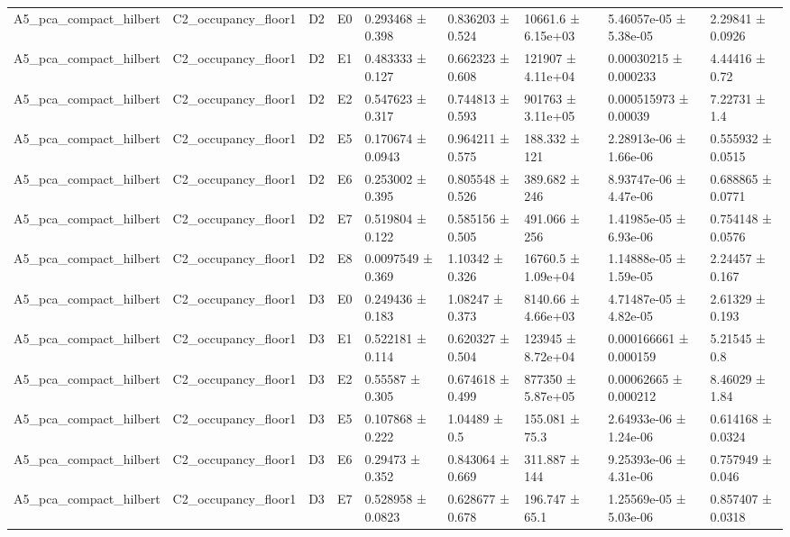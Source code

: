 \begin{table}
\begin{tabular}{lllllllll}
A5\_pca\_compact\_hilbert & C2\_occupancy\_floor1 & D2 & E0 & 0.293468 ± 0.398 & 0.836203 ± 0.524 & 10661.6 ± 6.15e+03 & 5.46057e-05 ± 5.38e-05 & 2.29841 ± 0.0926 \\
A5\_pca\_compact\_hilbert & C2\_occupancy\_floor1 & D2 & E1 & 0.483333 ± 0.127 & 0.662323 ± 0.608 & 121907 ± 4.11e+04 & 0.00030215 ± 0.000233 & 4.44416 ± 0.72 \\
A5\_pca\_compact\_hilbert & C2\_occupancy\_floor1 & D2 & E2 & 0.547623 ± 0.317 & 0.744813 ± 0.593 & 901763 ± 3.11e+05 & 0.000515973 ± 0.00039 & 7.22731 ± 1.4 \\
A5\_pca\_compact\_hilbert & C2\_occupancy\_floor1 & D2 & E5 & 0.170674 ± 0.0943 & 0.964211 ± 0.575 & 188.332 ± 121 & 2.28913e-06 ± 1.66e-06 & 0.555932 ± 0.0515 \\
A5\_pca\_compact\_hilbert & C2\_occupancy\_floor1 & D2 & E6 & 0.253002 ± 0.395 & 0.805548 ± 0.526 & 389.682 ± 246 & 8.93747e-06 ± 4.47e-06 & 0.688865 ± 0.0771 \\
A5\_pca\_compact\_hilbert & C2\_occupancy\_floor1 & D2 & E7 & 0.519804 ± 0.122 & 0.585156 ± 0.505 & 491.066 ± 256 & 1.41985e-05 ± 6.93e-06 & 0.754148 ± 0.0576 \\
A5\_pca\_compact\_hilbert & C2\_occupancy\_floor1 & D2 & E8 & 0.0097549 ± 0.369 & 1.10342 ± 0.326 & 16760.5 ± 1.09e+04 & 1.14888e-05 ± 1.59e-05 & 2.24457 ± 0.167 \\
A5\_pca\_compact\_hilbert & C2\_occupancy\_floor1 & D3 & E0 & 0.249436 ± 0.183 & 1.08247 ± 0.373 & 8140.66 ± 4.66e+03 & 4.71487e-05 ± 4.82e-05 & 2.61329 ± 0.193 \\
A5\_pca\_compact\_hilbert & C2\_occupancy\_floor1 & D3 & E1 & 0.522181 ± 0.114 & 0.620327 ± 0.504 & 123945 ± 8.72e+04 & 0.000166661 ± 0.000159 & 5.21545 ± 0.8 \\
A5\_pca\_compact\_hilbert & C2\_occupancy\_floor1 & D3 & E2 & 0.55587 ± 0.305 & 0.674618 ± 0.499 & 877350 ± 5.87e+05 & 0.00062665 ± 0.000212 & 8.46029 ± 1.84 \\
A5\_pca\_compact\_hilbert & C2\_occupancy\_floor1 & D3 & E5 & 0.107868 ± 0.222 & 1.04489 ± 0.5 & 155.081 ± 75.3 & 2.64933e-06 ± 1.24e-06 & 0.614168 ± 0.0324 \\
A5\_pca\_compact\_hilbert & C2\_occupancy\_floor1 & D3 & E6 & 0.29473 ± 0.352 & 0.843064 ± 0.669 & 311.887 ± 144 & 9.25393e-06 ± 4.31e-06 & 0.757949 ± 0.046 \\
A5\_pca\_compact\_hilbert & C2\_occupancy\_floor1 & D3 & E7 & 0.528958 ± 0.0823 & 0.628677 ± 0.678 & 196.747 ± 65.1 & 1.25569e-05 ± 5.03e-06 & 0.857407 ± 0.0318 \\

\end{tabular}
\end{table}
